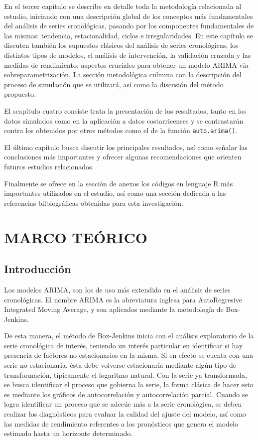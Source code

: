 \documentclass[
]{article}
\begin{document}
En el tercer capítulo se describe en detalle toda la metodología
relacionada al estudio, iniciando con una descripción global de los
conceptos más fundamentales del análisis de series cronológicas, pasando
por los componentes fundamentales de las mismas: tendencia,
estacionalidad, ciclos e irregularidades. En este capítulo se discuten
también los supuestos clásicos del análisis de series cronológicas, los
distintos tipos de modelos, el análisis de intervención, la validación
cruzada y las medidas de rendimiento; aspectos cruciales para obtener un
modelo ARIMA vía sobreparametrización. La sección metodológica culmina
con la descripción del proceso de simulación que se utilizará, así como
la discusión del método propuesto.

El scapítulo cuatro consiste trata la presentación de los resultados,
tanto en los datos simulados como en la aplicación a datos
costarricenses y se contrastarán contra los obtenidos por otros métodos
como el de la función \texttt{auto.arima()}.

El último capítulo busca discutir los principales resultados, así como
señalar las conclusiones más importantes y ofrecer algunas
recomendaciones que orienten futuros estudios relacionados.

Finalmente se ofrece en la sección de anexos los códigos en lenguaje R
más importantes utilizados en el estudio, así como una sección dedicada
a las referencias bilbiográficas obtenidas para esta investigación.

\newpage

\section{MARCO TEÓRICO}

\subsection{Introducción}

Los modelos ARIMA, son los de uso más extendido en el análisis de series
cronológicas. El nombre ARIMA es la abreviatura inglesa para
AutoRegresive Integrated Moving Average, y son aplicados mediante la
metodología de Box-Jenkins.

De esta manera, el método de Box-Jenkins inicia con el análisis
exploratorio de la serie cronológica de interés, teniendo un interés
particular en identificar si hay presencia de factores no estacionarios
en la misma. Si en efecto se cuenta con una serie no estacionaria, ésta
debe volverse estacionaria mediante algún tipo de transformación,
típicamente el logaritmo natural. Con la serie ya transformada, se busca
identificar el proceso que gobierna la serie, la forma clásica de hacer
esto es mediante los gráficos de autocorrelación y autocorrelación
parcial. Cuando se logra identificar un proceso que se adecúe más a la
serie cronológica, se deben realizar los diagnósticos para evaluar la
calidad del ajuste del modelo, así como las medidas de rendimiento
referentes a los pronósticos que genera el modelo estimado hasta un
horizonte determinado.
\end{document}

